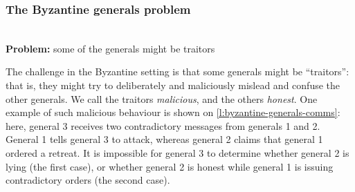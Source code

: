 \begin{frame}
    \label{s:byzantine-generals}
    \frametitle{The Byzantine generals problem}
    \begin{center}
        \\[1.5em]
        \textbf{Problem:} some of the generals might be traitors
    \end{center}
\end{frame}
\label{l:byzantine-generals}

The challenge in the Byzantine setting is that some generals might be ``traitors'': that is, they might try to deliberately and maliciously mislead and confuse the other generals.
We call the traitors \emph{malicious}, and the others \emph{honest}.
One example of such malicious behaviour is shown on \autoref{l:byzantine-generals-comms}: here, general 3 receives two contradictory messages from generals 1 and 2.
General 1 tells general 3 to attack, whereas general 2 claims that general 1 ordered a retreat.
It is impossible for general 3 to determine whether general 2 is lying (the first case), or whether general 2 is honest while general 1 is issuing contradictory orders (the second case).


